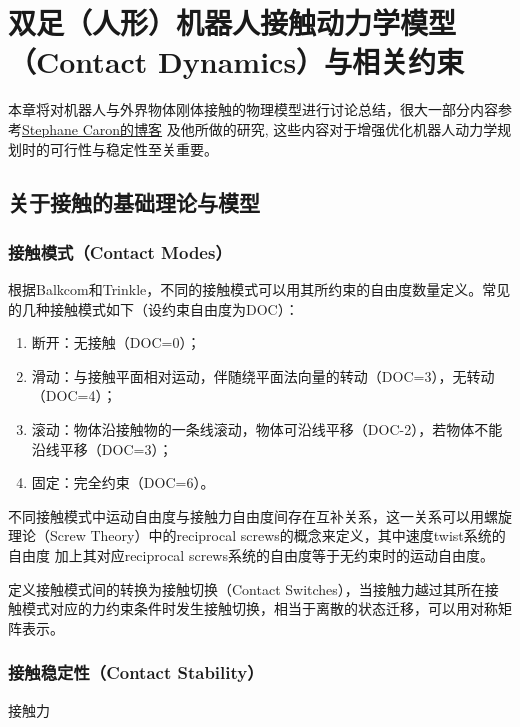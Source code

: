 \section{双足（人形）机器人接触动力学模型（Contact Dynamics）与相关约束}
    本章将对机器人与外界物体刚体接触的物理模型进行讨论总结，很大一部分内容参考\href{https://scaron.info/category/robotics.html}{Stephane Caron的博客}
    及他所做的研究\cite{caronLeveragingConeDouble2015,caronStabilitySurfaceContacts2015,caronMulticontactWalkingPattern2016},
    这些内容对于增强优化机器人动力学规划时的可行性与稳定性至关重要。
    \subsection{关于接触的基础理论与模型}
        \subsubsection{接触模式（Contact Modes）}
            根据Balkcom和Trinkle\cite{balkcomComputingWrenchCones2002}，不同的接触模式可以用其所约束的自由度数量定义。常见的几种接触模式如下（设约束自由度为DOC）：
            \begin{enumerate}[（1）]
                \item 断开：无接触（DOC=0）；
                \item 滑动：与接触平面相对运动，伴随绕平面法向量的转动（DOC=3），无转动（DOC=4）；
                \item 滚动：物体沿接触物的一条线滚动，物体可沿线平移（DOC-2），若物体不能沿线平移（DOC=3）；
                \item 固定：完全约束（DOC=6）。
            \end{enumerate}
            不同接触模式中运动自由度与接触力自由度间存在互补关系，这一关系可以用螺旋理论（Screw Theory）中的reciprocal screws的概念来定义，其中速度twist系统的自由度
            加上其对应reciprocal screws系统的自由度等于无约束时的运动自由度。

            定义接触模式间的转换为接触切换（Contact Switches），当接触力越过其所在接触模式对应的力约束条件时发生接触切换，相当于离散的状态迁移，可以用对称矩阵表示。
        \subsubsection{接触稳定性（Contact Stability）}
            接触力
